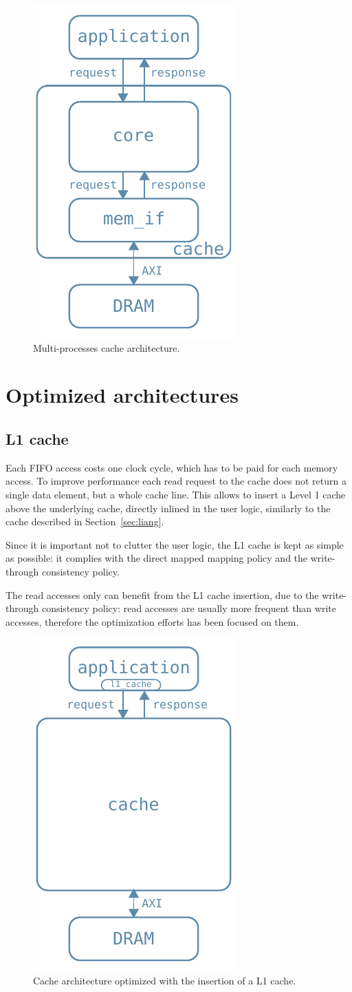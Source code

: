 \documentclass[11pt,a4paper]{memoir}
\begin{document}
\begin{figure}
	\centering
	\includegraphics[width=.3\textwidth]{basic_arch_inner}
	\caption{Multi-processes cache architecture.}
	\label{fig:basic_arch_inner}
\end{figure}

\chapter{Optimized architectures}
\section{L1 cache}
Each FIFO access costs one clock cycle, which has to be paid for each memory
access. 
To improve performance each read request to the cache does not return a single
data element, but a whole cache line. This allows to insert a Level 1 cache
above the underlying cache, directly inlined in the user logic, similarly to
the cache described in Section~\ref{sec:liang}.

Since it is important not to clutter the user logic, the L1 cache is kept as
simple as possible: it complies with the direct mapped mapping policy and the
write-through consistency policy.

The read accesses only can benefit from the L1 cache insertion, due to the
write-through consistency policy: read accesses are usually more frequent than
write accesses, therefore the optimization efforts has been focused on them.

\begin{figure}
	\centering
	\includegraphics[width=.3\textwidth]{l1_arch}
	\caption{Cache architecture optimized with the insertion of a L1 cache.}
	\label{fig:l1_arch}
\end{figure}
\end{document}
